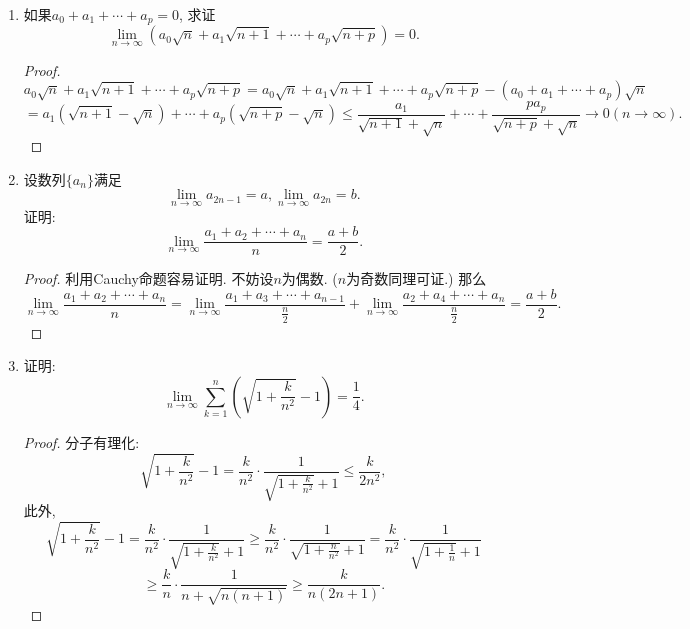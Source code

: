 \documentclass[UTF8,11pt, a4paper, oneside, fontset=none]{ctexbook}
\begin{document}
\begin{enumerate}
\begin{proof}


(1) 利用迫敛性, $a_n - c_n \leq a_n - b  \leq 0$, 令$n \to \infty$即可.

(2) 否. 反例令$a_n = n - \frac{1}{n}, b_n = n, c_n = n + \frac{1}{n}$即可.

(3) 否. 当$b=a$或$a=c$构造单调数列反例.

\end{proof}


\item
如果$a_0 + a_1 + \cdots + a_p =0$, 求证
\[
\lim_{n \to \infty} (a_0 \sqrt n + a_1 \sqrt{n+1} + \cdots + a_p \sqrt{n+p})=0.
\]


\begin{proof}

\[
a_0 \sqrt n + a_1 \sqrt{n+1} + \cdots + a_p \sqrt{n+p} = a_0 \sqrt n + a_1 \sqrt{n+1} + \cdots + a_p \sqrt{n+p}  - (a_0 + a_1 + \cdots + a_p) \sqrt{n} 
\]
\[
= a_1 (\sqrt{n+1}-\sqrt{n}) + \cdots + a_p (\sqrt{n+p} - \sqrt{n}) \leq \frac{a_1}{\sqrt{n+1} + \sqrt{n}} + \cdots + \frac{p a_p}{\sqrt{n+p} + \sqrt{n}} \to 0 (n \to \infty).
\]


\end{proof}

\item
设数列$\{a_n\}$满足
\[
\lim_{n \to \infty} a_{2n-1} =a, \lim_{n \to \infty} a_{2n} =b.
\]
证明:
\[
\lim_{n \to \infty} \frac{a_1 + a_2 + \cdots + a_n}{n} = \frac{a+b}{2}.
\]


\begin{proof}

利用Cauchy命题容易证明. 不妨设$n$为偶数. ($n$为奇数同理可证.) 那么
\[
\lim_{n \to \infty} \frac{a_1 + a_2 + \cdots + a_n}{n} = \lim_{n \to \infty} \frac{a_1 + a_3 + \cdots + a_{n-1}}{\frac{n}{2}} + \lim_{n \to \infty} \frac{a_2 + a_4 + \cdots + a_n}{\frac{n}{2}} = \frac{a+b}{2}.
\]

\end{proof}


\item
证明:
\[
\lim_{n \to \infty} \sum_{k=1}^n \left( \sqrt{1 + \frac{k}{n^2} } -1\right) = \frac{1}{4}.
\]


\begin{proof}

分子有理化:
\[
\sqrt{1 + \frac{k}{n^2} } -1 = \frac{k}{n^2} \cdot \frac{1}{\sqrt{1 + \frac{k}{n^2} } +1} \leq \frac{k}{2n^2},
\]
此外, 
\[
\sqrt{1 + \frac{k}{n^2} } -1 = \frac{k}{n^2} \cdot \frac{1}{\sqrt{1 + \frac{k}{n^2} } +1} \geq \frac{k}{n^2} \cdot \frac{1}{\sqrt{1 + \frac{n}{n^2} } +1} = \frac{k}{n^2} \cdot \frac{1}{\sqrt{1 + \frac{1}{n} } +1} \]
\[
\geq \frac{k}{n} \cdot \frac{1}{n + \sqrt{n(n+1)}} \geq \frac{k}{n(2n+1)}.
\]



\end{proof}
\end{enumerate}
\end{document}
